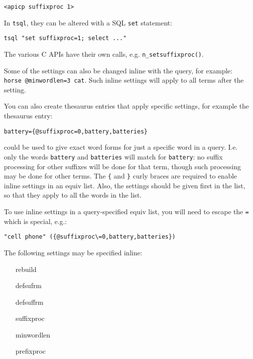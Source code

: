 \begin{verbatim}
<apicp suffixproc 1>
\end{verbatim}

In \verb`tsql`, they can be altered with a SQL \verb`set` statement:

\begin{verbatim}
tsql "set suffixproc=1; select ..."
\end{verbatim}

The various C APIs have their own calls, e.g. \verb`n_setsuffixproc()`.

Some of the settings can also be changed inline with the query, for
example: {\tt horse @minwordlen=3 cat}.  Such inline settings will
apply to all terms after the setting.

You can also create thesaurus entries that apply specific settings,
for example the thesaurus entry:

\begin{verbatim}
battery={@suffixproc=0,battery,batteries}
\end{verbatim}

could be used to give exact word forms for just a specific word in a
query.  I.e. only the words {\tt battery} and {\tt batteries} will
match for {\tt battery}: no suffix processing for other suffixes will
be done for that term, though such processing may be done for other
terms.  The {\tt \{} and {\tt \}} curly braces are required to enable
inline settings in an equiv list.  Also, the settings should be given
first in the list, so that they apply to all the words in the list.

To use inline settings in a query-specified equiv list, you will need
to escape the {\tt =} which is special, e.g.:

\begin{verbatim}
"cell phone" ({@suffixproc\=0,battery,batteries})
\end{verbatim}

The following settings may be specified inline:

\begin{itemize}
  \item[rebuild]
  \item[defsufrm]
  \item[defsuffrm]
  \item[suffixproc]
  \item[minwordlen]
  \item[prefixproc]
\end{itemize}
